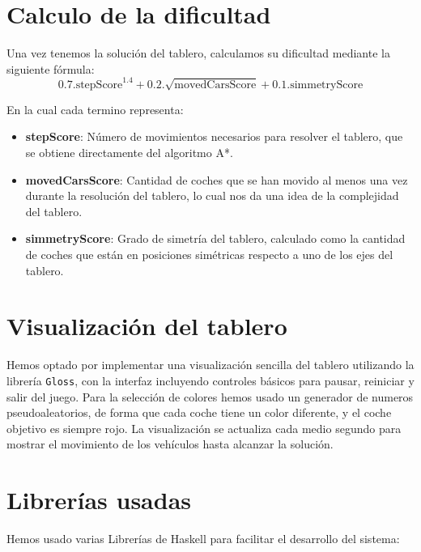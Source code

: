\documentclass{article}
\begin{document}
\section*{Calculo de la dificultad}

Una vez tenemos la solución del tablero, calculamos su dificultad mediante la siguiente fórmula:
\[
0.7 . \text{stepScore}^{1.4} + 0.2 . \sqrt{\text{movedCarsScore}} + 0.1 . \text{simmetryScore}
\]

En la cual cada termino representa:
\begin{itemize}
	\item \textbf{stepScore}: Número de movimientos necesarios para resolver el tablero, que se obtiene directamente del algoritmo A*.
	\item \textbf{movedCarsScore}: Cantidad de coches que se han movido al menos una vez durante la resolución del tablero, lo cual nos da una idea de la complejidad del tablero.
	\item \textbf{simmetryScore}: Grado de simetría del tablero, calculado como la cantidad de coches que están en posiciones simétricas respecto a uno de los ejes del tablero. 
\end{itemize}

\section*{Visualización del tablero}

Hemos optado por implementar una visualización sencilla del tablero utilizando la librería \texttt{Gloss}, con la interfaz incluyendo controles básicos para pausar, reiniciar y salir del juego. Para la selección de colores hemos usado un generador de numeros pseudoaleatorios, de forma que cada coche tiene un color diferente, y el coche objetivo es siempre rojo. La visualización se actualiza cada medio segundo para mostrar el movimiento de los vehículos hasta alcanzar la solución.

\section*{Librerías usadas}
Hemos usado varias Librerías de Haskell para facilitar el desarrollo del sistema:
\end{document}
